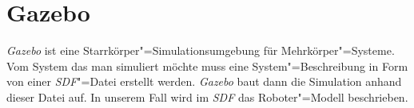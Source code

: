 %	
%	
%	
%	
%
% 	
% 
%
%
%	
%
%

\section{Gazebo}

\textit{Gazebo} ist eine Starrkörper"=Simulationsumgebung für Mehrkörper"=Systeme.
Vom System das man simuliert möchte muss eine System"=Beschreibung in Form von einer \textit{SDF}"=Datei erstellt werden.
\textit{Gazebo} baut dann die Simulation anhand dieser Datei auf. 
In unserem Fall wird im \textit{SDF} das Roboter"=Modell beschrieben.

